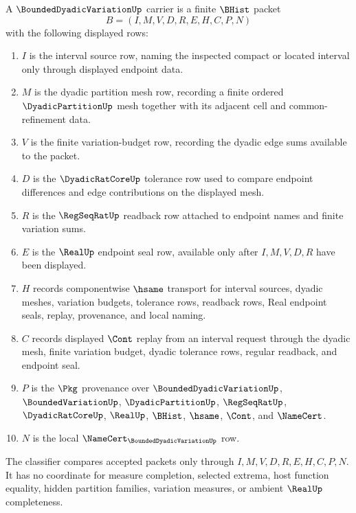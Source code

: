 \begin{definition}
\label{def:bounded-dyadic-variation-carrier}
A $\BoundedDyadicVariationUp$ carrier is a finite $\BHist$ packet
$$
B=(I,M,V,D,R,E,H,C,P,N)
$$
with the following displayed rows:
\begin{enumerate}
\item $I$ is the interval source row, naming the inspected compact or located interval only through displayed endpoint data.
\item $M$ is the dyadic partition mesh row, recording a finite ordered $\DyadicPartitionUp$ mesh together with its adjacent cell and common-refinement data.
\item $V$ is the finite variation-budget row, recording the dyadic edge sums available to the packet.
\item $D$ is the $\DyadicRatCoreUp$ tolerance row used to compare endpoint differences and edge contributions on the displayed mesh.
\item $R$ is the $\RegSeqRatUp$ readback row attached to endpoint names and finite variation sums.
\item $E$ is the $\RealUp$ endpoint seal row, available only after $I,M,V,D,R$ have been displayed.
\item $H$ records componentwise $\hsame$ transport for interval sources, dyadic meshes, variation budgets, tolerance rows, readback rows, Real endpoint seals, replay, provenance, and local naming.
\item $C$ records displayed $\Cont$ replay from an interval request through the dyadic mesh, finite variation budget, dyadic tolerance rows, regular readback, and endpoint seal.
\item $P$ is the $\Pkg$ provenance over $\BoundedDyadicVariationUp$, $\BoundedVariationUp$, $\DyadicPartitionUp$, $\RegSeqRatUp$, $\DyadicRatCoreUp$, $\RealUp$, $\BHist$, $\hsame$, $\Cont$, and $\NameCert$.
\item $N$ is the local $\NameCert_{\BoundedDyadicVariationUp}$ row.
\end{enumerate}
The classifier compares accepted packets only through $I,M,V,D,R,E,H,C,P,N$. It has no coordinate for measure completion, selected extrema, host function equality, hidden partition families, variation measures, or ambient $\RealUp$ completeness.
\end{definition}


